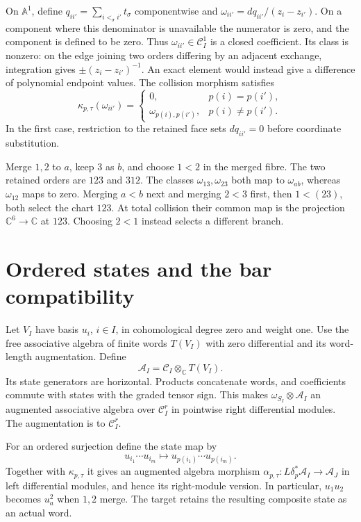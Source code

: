 On $\mathbb A^1$, define $q_{ii'}=\sum_{i<_\sigma i'}t_\sigma$
componentwise and
$\omega_{ii'}=dq_{ii'}/(z_i-z_{i'})$.
On a component where this denominator is unavailable the numerator
is zero, and the component is defined to be zero. Thus
$\omega_{ii'}\in\mathcal C_I^1$ is a closed coefficient.
Its class is nonzero: on the edge joining two orders differing
by an adjacent exchange, integration gives
$\pm(z_i-z_{i'})^{-1}$. An exact element would instead give a
difference of polynomial endpoint values.
The collision morphism satisfies
\begin{equation}\label{eq:native-collision-one-form}
 \kappa_{p,\tau}(\omega_{ii'})=
 \begin{cases}
 0,&p(i)=p(i'),\\
 \omega_{p(i),p(i')},&p(i)\ne p(i').
 \end{cases}
\end{equation}
In the first case, restriction to the retained face sets
$dq_{ii'}=0$ before coordinate substitution.

\begin{example}
Merge $1,2$ to $a$, keep $3$ as $b$, and choose $1<2$ in
the merged fibre. The two retained orders are $123$ and $312$.
The classes $\omega_{13},\omega_{23}$ both map to $\omega_{ab}$,
whereas $\omega_{12}$ maps to zero.
Merging $a<b$ next and merging $2<3$ first, then $1<(23)$,
both select the chart $123$. At total collision their common
map is the projection $\mathbb C^6\to\mathbb C$ at $123$.
Choosing $2<1$ instead selects a different branch.
\end{example}

\section{Ordered states and the bar compatibility}

Let $V_I$ have basis $u_i$, $i\in I$, in cohomological degree
zero and weight one. Use the free associative algebra of finite
words $T(V_I)$ with zero differential and its word-length
augmentation. Define
\[
 \mathcal A_I=\mathcal C_I\otimes_{\mathbb C}T(V_I).
\]
Its state generators are horizontal. Products concatenate words,
and coefficients commute with states with the graded tensor sign.
This makes $\omega_{S_I}\otimes\mathcal A_I$ an augmented
associative algebra over $\mathcal C_I^r$ in pointwise right
differential modules. The augmentation is to $\mathcal C_I^r$.

For an ordered surjection define the state map by
\[
 u_{i_1}\cdots u_{i_m}\longmapsto
 u_{p(i_1)}\cdots u_{p(i_m)}.
\]
Together with $\kappa_{p,\tau}$ it gives an augmented algebra
morphism $\alpha_{p,\tau}:L\delta_p^*\mathcal A_I\to\mathcal A_J$
in left differential modules, and hence its right-module version.
In particular, $u_1u_2$ becomes $u_a^2$ when $1,2$ merge. The
target retains the resulting composite state as an actual word.

